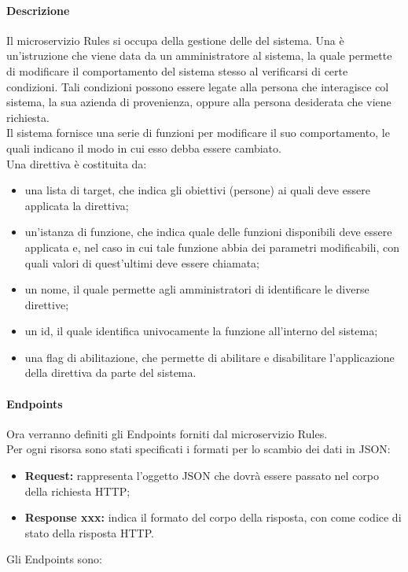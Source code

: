 \paragraph{Descrizione}
Il microservizio Rules si occupa della gestione delle  del sistema. Una  è un'istruzione che viene data da un amministratore al sistema, la quale permette di modificare il comportamento del sistema stesso al verificarsi di certe condizioni. Tali condizioni possono essere legate alla persona che interagisce col sistema, la sua azienda di provenienza, oppure alla persona desiderata che viene richiesta.\\
Il sistema fornisce una serie di funzioni per modificare il suo comportamento, le quali indicano il modo in cui esso debba essere cambiato. \\
Una direttiva è costituita da:
\begin{itemize}
	\item una lista di target, che indica gli obiettivi (persone) ai quali deve essere applicata la direttiva;
	\item un'istanza di funzione, che indica quale delle funzioni disponibili deve essere applicata e, nel caso in cui tale funzione abbia dei parametri modificabili, con quali valori di quest'ultimi deve essere chiamata;
	\item un nome, il quale permette agli amministratori di identificare le diverse direttive;
	\item un id, il quale identifica univocamente la funzione all'interno del sistema;
	\item una flag di abilitazione, che permette di abilitare e disabilitare l'applicazione della direttiva da parte del sistema.
\end{itemize}

\paragraph{Endpoints}

Ora verranno definiti gli Endpoints forniti dal microservizio Rules.\\
Per ogni risorsa sono stati specificati i formati per lo scambio dei dati in JSON:
\begin{itemize}
\item \textbf{Request:} rappresenta l’oggetto JSON che dovrà essere passato nel corpo della richiesta HTTP;
\item \textbf{Response xxx:} indica il formato del corpo della risposta, con  come codice di stato della risposta HTTP.
\end{itemize}
Gli Endpoints sono:

